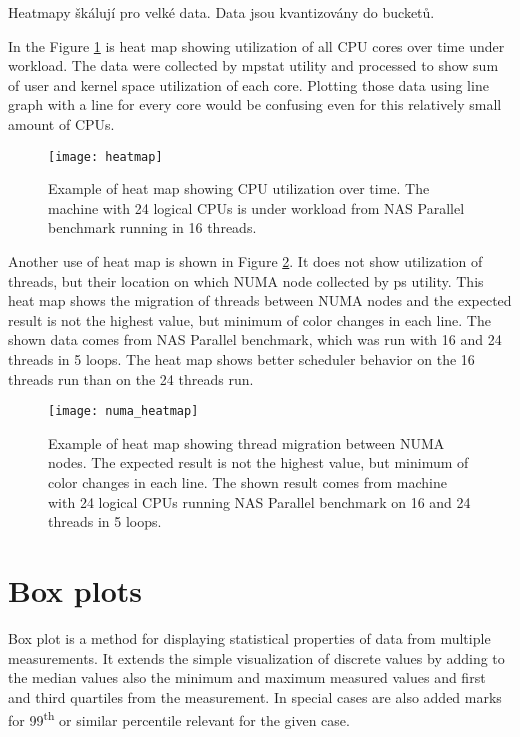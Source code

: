 Heatmapy škálují pro velké data. 
Data jsou kvantizovány do bucketů.

In the Figure \ref{fig:heatmap} is heat map showing utilization of all CPU cores over
time under workload. The data were collected by mpstat utility and processed to
show sum of user and kernel space utilization of each core. Plotting those data
using line graph with a line for every core would be confusing even for this
relatively small amount of CPUs.

\begin{figure}
  \centering
  \texttt{[image: heatmap]}
  \caption{Example of heat map showing CPU utilization over time. The machine
    with 24 logical CPUs is under workload from NAS Parallel benchmark running
    in 16 threads.}
  \label{fig:heatmap}
\end{figure}

Another use of heat map is shown in Figure \ref{fig:numa_heatmap}. It does not
show utilization of threads, but their location on which NUMA node collected by
ps utility. This heat map shows the migration of threads between NUMA nodes and
the expected result is not the highest value, but minimum of color changes in
each line. The shown data comes from NAS Parallel benchmark, which was run with
16 and 24 threads in 5 loops. The heat map shows better scheduler behavior on
the 16 threads run than on the 24 threads run.

\begin{figure}
  \centering
  \texttt{[image: numa\_heatmap]}
  \caption{Example of heat map showing thread migration between NUMA nodes. The
    expected result is not the highest value, but minimum of color changes in
    each line. The shown result comes from machine with 24 logical CPUs running
    NAS Parallel benchmark on 16 and 24 threads in 5 loops.}
  \label{fig:numa_heatmap}
\end{figure}

\section{Box plots}
Box plot is a method for displaying statistical properties of data from multiple
measurements. It extends the simple visualization of discrete values by adding
to the median values also the minimum and maximum measured values and first and
third quartiles from the measurement. In special cases are also added marks for
99\textsuperscript{th} or similar percentile relevant for the given case.

